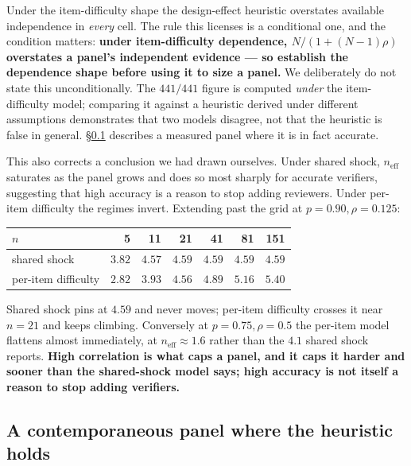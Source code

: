 \documentclass[11pt,a4paper]{article}
\newcommand{\neff}{n_{\mathrm{eff}}}
\begin{document}
Under the item-difficulty shape the design-effect heuristic overstates available
independence in \emph{every} cell. The rule this licenses is a conditional one,
and the condition matters: \textbf{under item-difficulty dependence,
$N/(1+(N-1)\rho)$ overstates a panel's independent evidence --- so establish the
dependence shape before using it to size a panel.} We deliberately do not state
this unconditionally. The $441/441$ figure is computed \emph{under} the
item-difficulty model; comparing it against a heuristic derived under different
assumptions demonstrates that two models disagree, not that the heuristic is
false in general. \S\ref{sec:related-panels} describes a measured panel where it
is in fact accurate.

This also corrects a conclusion we had drawn ourselves. Under shared shock,
$\neff$ saturates as the panel grows and does so most sharply for accurate
verifiers, suggesting that high accuracy is a reason to stop adding reviewers.
Under per-item difficulty the regimes invert. Extending past the grid at
$p = 0.90, \rho = 0.125$:

\begin{center}
\begin{tabular}{lrrrrrr}
\toprule
$n$ & 5 & 11 & 21 & 41 & 81 & 151 \\
\midrule
shared shock        & $3.82$ & $4.57$ & $4.59$ & $4.59$ & $4.59$ & $4.59$ \\
per-item difficulty & $2.82$ & $3.93$ & $4.56$ & $4.89$ & $5.16$ & $5.40$ \\
\bottomrule
\end{tabular}
\end{center}

Shared shock pins at $4.59$ and never moves; per-item difficulty crosses it near
$n = 21$ and keeps climbing. Conversely at $p = 0.75, \rho = 0.5$ the per-item
model flattens almost immediately, at $\neff \approx 1.6$ rather than the $4.1$
shared shock reports. \textbf{High correlation is what caps a panel, and it caps
it harder and sooner than the shared-shock model says; high accuracy is not
itself a reason to stop adding verifiers.}

\subsection{A contemporaneous panel where the heuristic holds}
\label{sec:related-panels}
\end{document}
